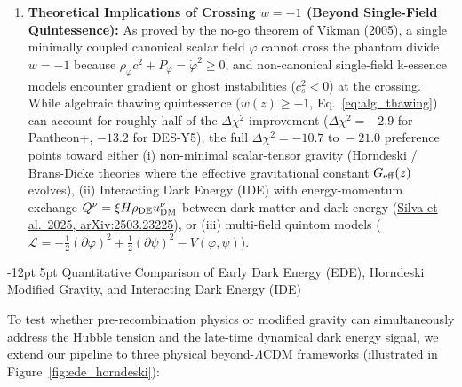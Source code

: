 \documentclass[11pt,letterpaper]{article}
\makeatletter
\renewcommand{\subsection}{\@startsection{subsection}{2}{\z@}%
  {-12pt \@plus -3pt \@minus -1pt}%
  {5pt \@plus 1pt}%
  {\normalfont\large\bfseries\color{tealaccent}}}
\makeatother
\begin{document}
\begin{enumerate}
    \item \textbf{Theoretical Implications of Crossing $w = -1$ (Beyond Single-Field Quintessence):} As proved by the no-go theorem of Vikman (2005), a single minimally coupled canonical scalar field $\varphi$ cannot cross the phantom divide $w = -1$ because $\rho_\varphi c^2 + P_\varphi = \dot{\varphi}^2 \ge 0$, and non-canonical single-field k-essence models encounter gradient or ghost instabilities ($c_s^2 < 0$) at the crossing. While algebraic thawing quintessence ($w(z) \ge -1$, Eq.~\ref{eq:alg_thawing}) can account for roughly half of the $\Delta\chi^2$ improvement ($\Delta\chi^2 = -2.9$ for Pantheon+, $-13.2$ for DES-Y5), the full $\Delta\chi^2 = -10.7\text{ to }-21.0$ preference points toward either (i) non-minimal scalar-tensor gravity (Horndeski / Brans-Dicke theories where the effective gravitational constant $G_{\rm eff}(z)$ evolves), (ii) Interacting Dark Energy (IDE) with energy-momentum exchange $Q^\nu = \xi H \rho_{\rm DE} u^\nu_{\rm DM}$ between dark matter and dark energy (\href{https://arxiv.org/pdf/2503.23225}{Silva et al.\ 2025, arXiv:2503.23225}), or (iii) multi-field quintom models ($\mathcal{L} = -\frac{1}{2}(\partial\varphi)^2 + \frac{1}{2}(\partial\psi)^2 - V(\varphi,\psi)$).
\end{enumerate}


\subsection{Quantitative Comparison of Early Dark Energy (EDE), Horndeski Modified Gravity, and Interacting Dark Energy (IDE)}

To test whether pre-recombination physics or modified gravity can simultaneously address the Hubble tension and the late-time dynamical dark energy signal, we extend our pipeline to three physical beyond-$\Lambda$CDM frameworks (illustrated in Figure~\ref{fig:ede_horndeski}):
\end{document}
